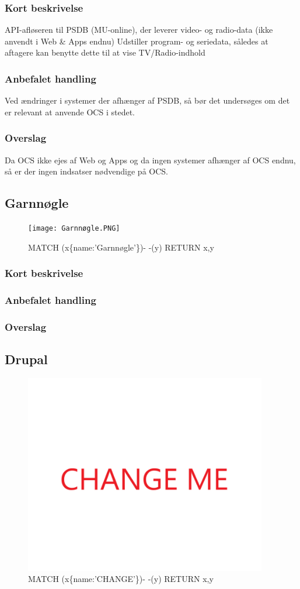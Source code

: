 \documentclass{article}
\begin{document}
\subsubsection{Kort beskrivelse}
API-afløseren til PSDB (MU-online), der leverer video- og radio-data (ikke anvendt i Web \& Apps endnu)	Udstiller program- og seriedata, således at aftagere kan benytte dette til at vise TV/Radio-indhold
\subsubsection{Anbefalet handling}
Ved ændringer i systemer der afhænger af PSDB, så bør det undersøges om det er relevant at anvende OCS i stedet.
\subsubsection{Overslag}
Da OCS ikke ejes af Web og Apps og da ingen systemer afhænger af OCS endnu, så er der ingen indsatser nødvendige på OCS.


\subsection{Garnnøgle}
\begin{figure}[h]
\texttt{[image: Garnnøgle.PNG]}
\caption{MATCH (x\{name:'Garnnøgle'\})- -(y) RETURN x,y}
\end{figure}
\subsubsection{Kort beskrivelse}
\subsubsection{Anbefalet handling}
\subsubsection{Overslag}


\subsection{Drupal}
\begin{figure}[h]
\includegraphics[width=300pt]{CHANGE.PNG}
\caption{MATCH (x\{name:'CHANGE'\})- -(y) RETURN x,y}
\end{figure}
\end{document}
